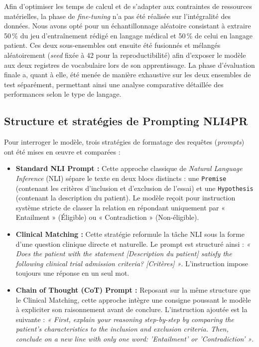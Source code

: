 \documentclass[10pt,twoside]{article}
\begin{document}
Afin d'optimiser les temps de calcul et de s'adapter aux contraintes de ressources matérielles, la phase de \textit{fine-tuning} n'a pas été réalisée sur l'intégralité des données. Nous avons opté pour un échantillonnage aléatoire consistant à extraire 50\,\% du jeu d'entraînement rédigé en langage médical et 50\,\% de celui en langage patient. Ces deux sous-ensembles ont ensuite été fusionnés et mélangés aléatoirement (\textit{seed} fixée à 42 pour la reproductibilité) afin d'exposer le modèle aux deux registres de vocabulaire lors de son apprentissage. La phase d'évaluation finale a, quant à elle, été menée de manière exhaustive sur les deux ensembles de test séparément, permettant ainsi une analyse comparative détaillée des performances selon le type de langage.

\subsection{Structure et stratégies de Prompting NLI4PR}
Pour interroger le modèle, trois stratégies de formatage des requêtes (\textit{prompts}) ont été mises en œuvre et comparées :
\begin{itemize}
    \item \textbf{Standard NLI Prompt :} Cette approche classique de \textit{Natural Language Inference} (NLI) sépare le texte en deux blocs distincts : une \texttt{Premise} (contenant les critères d'inclusion et d'exclusion de l'essai) et une \texttt{Hypothesis} (contenant la description du patient). Le modèle reçoit pour instruction système stricte de classer la relation en répondant uniquement par « Entailment » (Éligible) ou « Contradiction » (Non-éligible).
    \item \textbf{Clinical Matching :} Cette stratégie reformule la tâche NLI sous la forme d'une question clinique directe et naturelle. Le prompt est structuré ainsi : \textit{« Does the patient with the statement [Description du patient] satisfy the following clinical trial admission criteria? [Critères] »}. L'instruction impose toujours une réponse en un seul mot.
    \item \textbf{Chain of Thought (CoT) Prompt :} Reposant sur la même structure que le Clinical Matching, cette approche intègre une consigne poussant le modèle à expliciter son raisonnement avant de conclure. L'instruction ajoutée est la suivante : \textit{« First, explain your reasoning step-by-step by comparing the patient's characteristics to the inclusion and exclusion criteria. Then, conclude on a new line with only one word: 'Entailment' or 'Contradiction' »}.
\end{itemize}
\end{document}
